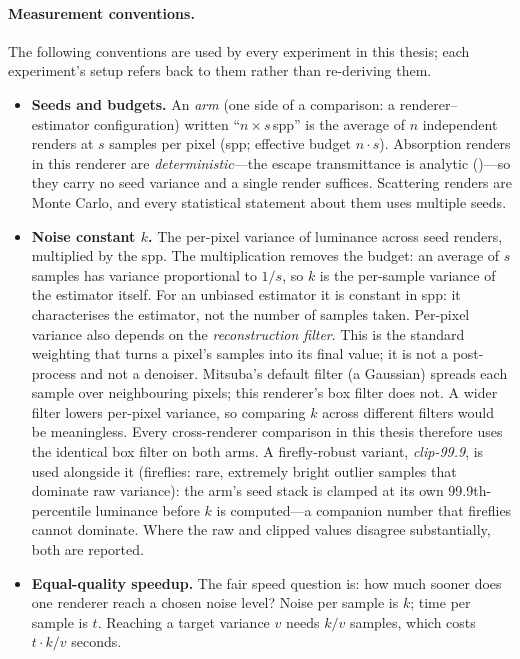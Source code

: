 \paragraph{Measurement conventions.} The following conventions are used by every experiment in this
thesis; each experiment's setup refers back to them rather than re-deriving them.
\begin{itemize}
  \item \textbf{Seeds and budgets.} An \emph{arm} (one side of a comparison: a renderer--estimator
  configuration) written ``$n\times s$\,spp'' is the average of $n$ independent renders at $s$ samples per pixel (spp; effective budget
$n\cdot s$). Absorption
  renders in this renderer are \emph{deterministic}---the escape transmittance is analytic
  ()---so they carry no seed variance and a single render suffices. Scattering
  renders are Monte Carlo, and every statistical statement about them uses multiple seeds.
  \item \textbf{Noise constant $k$.} The per-pixel variance of luminance across seed renders,
  multiplied by the spp. The multiplication removes the budget: an average of $s$ samples has
  variance proportional to $1/s$, so $k$ is the per-sample variance of the estimator itself. For
  an unbiased estimator it is constant in spp: it characterises the estimator, not the number of
  samples taken.
  Per-pixel variance also depends on the \emph{reconstruction filter}. This is the standard
  weighting that turns a pixel's samples into its final value; it is not a post-process and
  not a denoiser. Mitsuba's default filter (a Gaussian) spreads each sample over
neighbouring pixels;
  this renderer's box filter does not. A wider filter lowers per-pixel variance, so comparing
  $k$ across different filters would be meaningless. Every cross-renderer comparison in this
  thesis therefore uses the identical box filter on both arms. A firefly-robust variant, \emph{clip-99.9}, is used alongside it (fireflies: rare,
extremely bright outlier samples that dominate raw variance): the arm's seed stack is
clamped at its own \num{99.9}th-percentile luminance before $k$ is computed---a companion
number that fireflies cannot dominate. Where the raw and clipped values disagree substantially, both are reported.
  \item \textbf{Equal-quality speedup.} The fair speed question is: how much sooner does one
  renderer reach a chosen noise level? Noise per sample is $k$; time per sample is $t$.
  Reaching a target variance $v$ needs $k/v$ samples, which costs $t \cdot k/v$ seconds.

\end{itemize}
